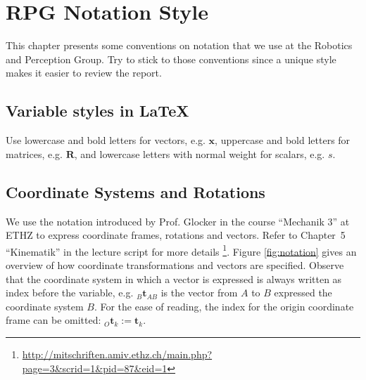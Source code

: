\chapter{RPG Notation Style}\label{chap:notation}

This chapter presents some conventions on notation that we use at the Robotics and Perception Group.
Try to stick to those conventions since a unique style makes it easier to review the report.

\section{Variable styles in \LaTeX}

Use lowercase and bold letters for vectors, e.g. $\textbf{x}$, uppercase and bold letters for matrices, e.g. $\textbf{R}$, and lowercase letters with normal weight for scalars, e.g. $s$.

\section{Coordinate Systems and Rotations}

We use the notation introduced by Prof. Glocker in the course ``Mechanik 3'' at ETHZ to express coordinate frames, rotations and vectors.
Refer to Chapter~5 ``Kinematik'' in the lecture script for more details \footnote{\url{http://mitschriften.amiv.ethz.ch/main.php?page=3&scrid=1&pid=87&eid=1}}.
Figure \ref{fig:notation} gives an overview of how coordinate transformations and vectors are specified.
Observe that the coordinate system in which a vector is expressed is always written as index before the variable, e.g. $_B\mathbf{t}_{AB}$ is the vector from $A$ to $B$ expressed the coordinate system $B$.
For the ease of reading, the index for the origin coordinate frame can be omitted: $_O\mathbf{t}_k := \mathbf{t}_k$.

